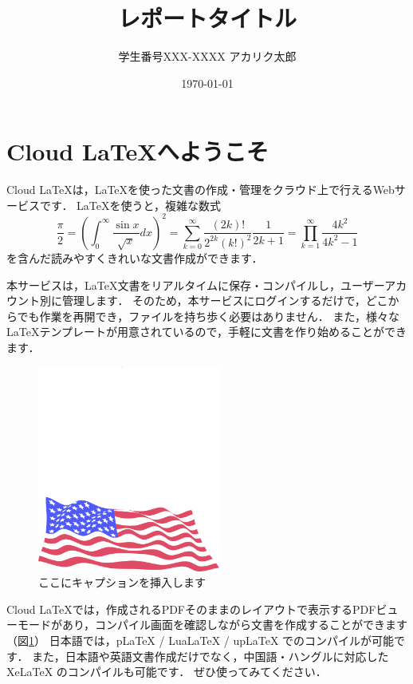 \documentclass[uplatex]{jsarticle}
\title{レポートタイトル}
\author{学生番号XXX-XXXX アカリク太郎}
\date{\today}
\begin{document}
\maketitle
\section{Cloud LaTeXへようこそ}

Cloud LaTeXは，\LaTeX を使った文書の作成・管理をクラウド上で行えるWebサービスです．
\LaTeX を使うと，複雑な数式
\begin{equation}
  \frac{\pi}{2} =
  \left( \int_{0}^{\infty} \frac{\sin x}{\sqrt{x}} dx \right)^2 =
  \sum_{k=0}^{\infty} \frac{(2k)!}{2^{2k}(k!)^2} \frac{1}{2k+1} =
  \prod_{k=1}^{\infty} \frac{4k^2}{4k^2 - 1}
\end{equation}
を含んだ読みやすくきれいな文書作成ができます．

本サービスは，\LaTeX 文書をリアルタイムに保存・コンパイルし，ユーザーアカウント別に管理します．
そのため，本サービスにログインするだけで，どこからでも作業を再開でき，ファイルを持ち歩く必要はありません．
また，様々な \LaTeX テンプレートが用意されているので，手軽に文書を作り始めることができます．

\begin{figure}
 \centering
   \includegraphics[width=60mm]{figures/Sample.png}
 \caption{ここにキャプションを挿入します}
 \label{fig:model}
\end{figure}

Cloud LaTeXでは，作成されるPDFそのままのレイアウトで表示するPDFビューモードがあり，コンパイル画面を確認しながら文書を作成することができます（図\ref{fig:model}）
日本語では，pLaTeX / LuaLaTeX / upLaTeX でのコンパイルが可能です．
また，日本語や英語文書作成だけでなく，中国語・ハングルに対応した XeLaTeX のコンパイルも可能です．
ぜひ使ってみてください．
\end{document}
